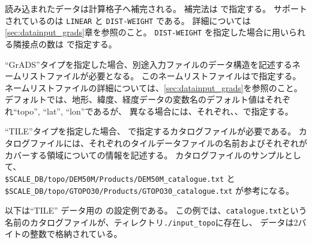 読み込まれたデータは計算格子へ補完される。
補完法は  で指定する。
サポートされているのは \verb|LINEAR| と \verb|DIST-WEIGHT| である。
詳細については \ref{sec:datainput_grads}章を参照のこと。
\verb|DIST-WEIGHT| を指定した場合に用いられる隣接点の数は  で指定する。



``GrADS''タイプを指定した場合、別途入力ファイルのデータ構造を記述するネームリストファイルが必要となる。
このネームリストファイルはで指定する。
ネームリストファイルの詳細については、\ref{sec:datainput_grads}を参照のこと。
デフォルトでは、地形、緯度、経度データの変数名のデフォルト値はそれぞれ``topo'', ``lat'', ``lon''であるが、
異なる場合には、それぞれ、、で指定する。


``TILE''タイプを指定した場合、 で指定するカタログファイルが必要である。
カタログファイルには、それぞれのタイルデータファイルの名前およびそれぞれがカバーする領域についての情報を記述する。
カタログファイルのサンプルとして、\\ \verb|$SCALE_DB/topo/DEM50M/Products/DEM50M_catalogue.txt| と\\
\verb|$SCALE_DB/topo/GTOPO30/Products/GTOPO30_catalogue.txt| が参考になる。

以下は``TILE'' データ用の  の設定例である。
この例では、\verb|catalogue.txt|という名前のカタログファイルが、ティレクトリ\verb|./input_topo|に存在し、
データは2バイトの整数で格納されている。

